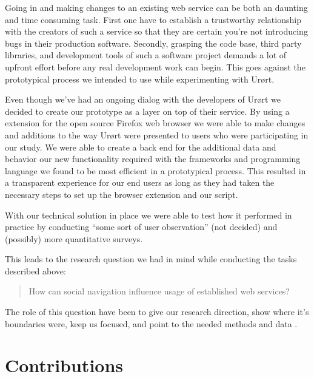 Going in and making changes to an existing web service can be both an
daunting and time consuming task. First one have to establish a trustworthy
relationship with the creators of such a service so that they are certain
you're not introducing bugs in their production software. Secondly, grasping the
code base, third party libraries, and development tools of such a software
project demands a lot of upfront effort before any real development work can
begin. This goes against the prototypical process we intended to use while
experimenting with Ur\o{}rt.

Even though we've had an ongoing dialog with the developers of Ur\o{}rt we
decided to create our prototype as a layer on top of their service. By using a
extension for the open source Firefox%
web browser we were able to make changes and additions to the way Ur\o{}rt were
presented to users who were participating in our study. We were able to create
a back end for the additional data and behavior our new functionality required
with the frameworks and programming language we found to be most efficient in
a prototypical process. This resulted in a transparent experience for our end
users as long as they had taken the necessary steps to set up the browser
extension and our script.

With our technical solution in place we were able to test how it performed in
practice by conducting ``some sort of user observation'' (not decided) and
(possibly) more quantitative surveys.

This leads to the research question we had in mind while conducting
the tasks described above:

\begin{quote}
  How can social navigation influence usage of established web services?
\end{quote}

The role of this question have been to give our research direction, show where
it's boundaries were, keep us focused, and point to the needed methods and
data \citep[p.~77]{silverman05}.


\section{Contributions}

